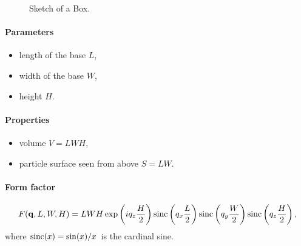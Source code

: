 \begin{figure}[ht]
\hfill
{}
\hfill
{}
\hfill
\caption{Sketch of a Box.}
\label{fig:box}
\end{figure}

\FloatBarrier

\paragraph{Parameters}
\begin{itemize}
\item length of the base $L$,
\item width of the base $W$,
\item height  $H$.
\end{itemize}

\paragraph{Properties}
\begin{itemize}
\item volume $V= LWH$,
\item particle surface seen from above $S = LW$.
\end{itemize}

\paragraph{Form factor}

\begin{equation*}
F(\mathbf{q},L,W,H)= L W H\exp\left(i q_z \frac{H}{2}\right) \operatorname{sinc}\left(q_x \frac{L}{2}\right)
\operatorname{sinc}\left(q_y \frac{W}{2}\right) \operatorname{sinc}\left(q_z \frac{H}{2}\right),
\end{equation*}
where $\operatorname{sinc}(x)=\sin(x)/x$ is the cardinal sine.

